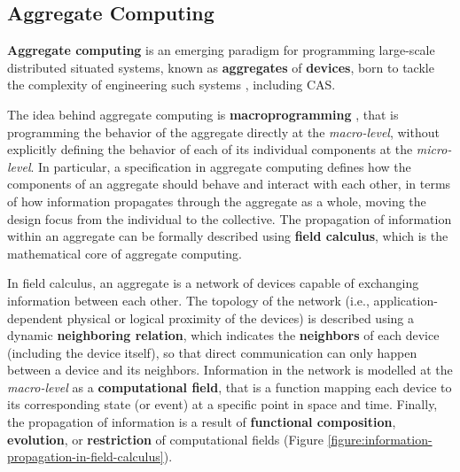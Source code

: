 
\subsection{Aggregate Computing}
\label{section:background:concepts:aggregate-computing}

\textbf{Aggregate computing} is an emerging paradigm for programming large-scale
distributed situated systems, known as \textbf{aggregates} of \textbf{devices},
born to tackle the complexity of engineering such systems
\cite{AggregateComputing}, including \ac{CAS}.

The idea behind aggregate computing is \textbf{macroprogramming}
\cite{Macroprogramming}, that is programming the behavior of the aggregate
directly at the \textit{macro-level}, without explicitly defining the behavior
of each of its individual components at the \textit{micro-level}. In
particular, a specification in aggregate computing defines how the components
of an aggregate should behave and interact with each other, in terms of how
information propagates through the aggregate as a whole, moving the design
focus from the individual to the collective. The propagation of information
within an aggregate can be formally described using \textbf{field calculus},
which is the mathematical core of aggregate computing.

In field calculus, an aggregate is a network of devices capable of exchanging
information between each other. The topology of the network (i.e.,
application-dependent physical or logical proximity of the devices) is
described using a dynamic \textbf{neighboring relation}, which indicates the
\textbf{neighbors} of each device (including the device itself), so that direct
communication can only happen between a device and its neighbors. Information
in the network is modelled at the \textit{macro-level} as a
\textbf{computational field}, that is a function mapping each device to its
corresponding state (or event) at a specific point in space and time. Finally,
the propagation of information is a result of \textbf{functional composition},
\textbf{evolution}, or \textbf{restriction} of computational fields (Figure
\ref{figure:information-propagation-in-field-calculus}).

